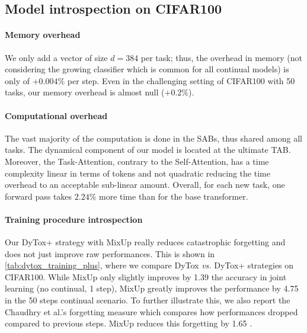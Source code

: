 \subsection{Model introspection on CIFAR100}

\paragraph{Memory overhead}
We only add a vector of size $d=384$ per task; thus, the overhead in memory (not considering the
growing classifier which is common for all continual models) is only of $+0.004\%$ per step. Even in
the challenging setting of CIFAR100 with 50 tasks, our memory overhead is almost null ($+0.2\%$).

\label{sec:dytox_comp_over}
\vspace{-1em}
\paragraph{Computational overhead} The vast majority of the computation is done in the SABs, thus
shared among all tasks. The dynamical component of our model is located at the ultimate TAB.
Moreover, the Task-Attention, contrary to the Self-Attention, has a time complexity linear in terms
of tokens and not quadratic reducing the time overhead to an acceptable sub-linear amount. Overall,
for each new task, one forward pass takes $2.24\%$ more time than for the base transformer.

\vspace{-1em}


\paragraph{Training procedure introspection} Our DyTox+ strategy with MixUp really reduces
catastrophic forgetting and does not just improve raw performances. This is shown in
\autoref{tab:dytox_training_plus}, where we compare DyTox \textit{vs.} DyTox+ strategies on CIFAR100.
While MixUp only slightly improves by 1.39 \pp the accuracy in joint learning (no continual, 1
step), MixUp greatly improves the performance by 4.75 \pp in the 50 steps continual scenario. To
further illustrate this, we also report the Chaudhry et al.'s forgetting
\cite{chaudhry2018riemannien_walk} measure which compares how performances dropped compared to
previous steps. MixUp reduces this forgetting by 1.65 \pp.

\vspace{-1em}
\label{sec:dytox_ablations}
